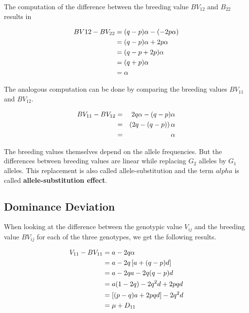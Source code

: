 \documentclass[]{book}
\theoremstyle{definition}
\theoremstyle{definition}
\theoremstyle{definition}
\theoremstyle{remark}
\begin{document}
The computation of the difference between the breeding value \(BV_{12}\) and \(B_{22}\) results in

\begin{align}
    BV{12} - BV_{22} &=   (q-p)\alpha - \left( -2p\alpha \right)  \notag \\
                      &=   (q-p)\alpha + 2p\alpha \notag \\
                      &=   (q-p+2p)\alpha \notag \\
                      &=   (q+p)\alpha \notag \\
                      &=   \alpha
  \label{eq:AdditiveBv1}
\end{align}

The analogous computation can be done by comparing the breeding values \(BV_{11}\) and \(BV_{12}\).

\begin{align}
    BV_{11} - BV_{12} & = & 2q\alpha - (q-p)\alpha \notag \\
                      & = & \left(2q - (q-p)\right)\alpha \notag\\
                      & = & \alpha 
  \label{eq:AdditiveBv2}
\end{align}

The breeding values themselves depend on the allele frequencies. But the differences between breeding values are linear while replacing \(G_2\) alleles by \(G_1\) alleles. This replacement is also called allele-substitution and the term \(alpha\) is called \textbf{allele-substitution effect}.

\hypertarget{dominance-deviation}{%
\subsection{Dominance Deviation}\label{dominance-deviation}}

When looking at the difference between the genotypic value \(V_{ij}\) and the breeding value \(BV_{ij}\) for each of the three genotypes, we get the following results.

\begin{align}
  V_{11} - BV_{11} &=   a - 2q \alpha \notag \\
                   &=   a - 2q \left[ a + (q-p)d \right] \notag \\
                   &=   a - 2qa -2q(q-p)d \notag \\
                   &=   a(1-2q) - 2q^2d + 2pqd \notag \\
                   &=   \left[(p - q)a + 2pqd\right] - 2q^2d \notag \\
                   &=   \mu + D_{11} 
  \end{align}
\end{document}
